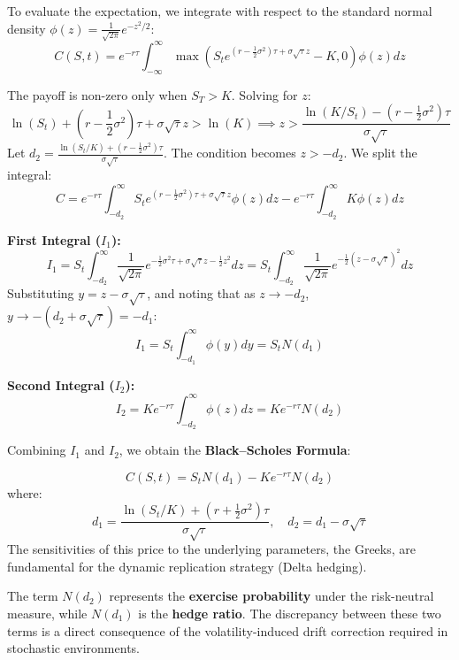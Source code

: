 To evaluate the expectation, we integrate with respect to the standard normal density $\phi(z) = \frac{1}{\sqrt{2\pi}}e^{-z^2/2}$:
\[ C(S, t) = e^{-r\tau} \int_{-\infty}^{\infty} \max\left( S_t e^{(r - \frac{1}{2}\sigma^2)\tau + \sigma\sqrt{\tau}z} - K, 0 \right) \phi(z) dz \]

The payoff is non-zero only when $S_T > K$. Solving for $z$:
\[ \ln(S_t) + (r - \frac{1}{2}\sigma^2)\tau + \sigma\sqrt{\tau}z > \ln(K) \implies z > \frac{\ln(K/S_t) - (r - \frac{1}{2}\sigma^2)\tau}{\sigma\sqrt{\tau}} \]
Let $d_2 = \frac{\ln(S_t/K) + (r - \frac{1}{2}\sigma^2)\tau}{\sigma\sqrt{\tau}}$. The condition becomes $z > -d_2$. We split the integral:
\[ C = e^{-r\tau} \int_{-d_2}^{\infty} S_t e^{(r - \frac{1}{2}\sigma^2)\tau + \sigma\sqrt{\tau}z} \phi(z) dz - e^{-r\tau} \int_{-d_2}^{\infty} K \phi(z) dz \]

\textbf{First Integral ($I_1$):}
\[ I_1 = S_t \int_{-d_2}^{\infty} \frac{1}{\sqrt{2\pi}} e^{-\frac{1}{2}\sigma^2\tau + \sigma\sqrt{\tau}z - \frac{1}{2}z^2} dz = S_t \int_{-d_2}^{\infty} \frac{1}{\sqrt{2\pi}} e^{-\frac{1}{2}(z - \sigma\sqrt{\tau})^2} dz \]
Substituting $y = z - \sigma\sqrt{\tau}$, and noting that as $z \to -d_2$, $y \to -(d_2 + \sigma\sqrt{\tau}) = -d_1$:
\[ I_1 = S_t \int_{-d_1}^{\infty} \phi(y) dy = S_t N(d_1) \]

\textbf{Second Integral ($I_2$):}
\[ I_2 = K e^{-r\tau} \int_{-d_2}^{\infty} \phi(z) dz = K e^{-r\tau} N(d_2) \]

Combining $I_1$ and $I_2$, we obtain the \textbf{Black--Scholes Formula}:

\[ C(S, t) = S_t N(d_1) - K e^{-r\tau} N(d_2) \]
where:
\[ d_1 = \frac{\ln(S_t/K) + (r + \frac{1}{2}\sigma^2)\tau}{\sigma\sqrt{\tau}}, \quad d_2 = d_1 - \sigma\sqrt{\tau} \]
The sensitivities of this price to the underlying parameters, the Greeks, are fundamental for the dynamic replication strategy (Delta hedging).





\begin{remark}
The term $N(d_2)$ represents the \textbf{exercise probability} under the risk-neutral measure, while $N(d_1)$ is the \textbf{hedge ratio}. The discrepancy between these two terms is a direct consequence of the volatility-induced drift correction required in stochastic environments.
\end{remark}
